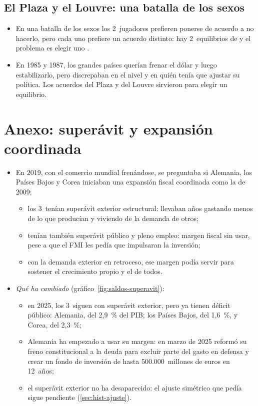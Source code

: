 \documentclass[11pt]{article}
\begin{document}
\subsection*{El Plaza y el Louvre: una batalla de los sexos}

\begin{itemize}
\item En una batalla de los sexos los 2~jugadores prefieren ponerse de acuerdo a no hacerlo, pero cada uno prefiere un acuerdo distinto: hay 2~equilibrios de  y el problema es elegir uno .
\item En 1985 y 1987, los grandes países querían frenar el dólar y luego estabilizarlo, pero discrepaban en el nivel y en quién tenía que ajustar su política. Los acuerdos del Plaza y del Louvre sirvieron para elegir un equilibrio\nocite{G51985Plaza,G61987Louvre}.
\end{itemize}

\section{Anexo: superávit y expansión coordinada}\label{anexo:superavit}

\begin{itemize}
\item En 2019, con el comercio mundial frenándose, \textcite{GarciaAndres2019Oberturas} se preguntaba si Alemania, los Países Bajos y Corea iniciaban una expansión fiscal coordinada como la de 2009:
  \begin{itemize}
  \item los 3~tenían superávit exterior estructural: llevaban años gastando menos de lo que producían y viviendo de la demanda de otros;
  \item tenían también superávit público y pleno empleo: margen fiscal sin usar, pese a que el FMI les pedía que impulsaran la inversión;
  \item con la demanda exterior en retroceso, ese margen podía servir para sostener el crecimiento propio y el de todos.
  \end{itemize}
\item \emph{Qué ha cambiado} (gráfico~\ref{fig:saldos-superavit}):
  \begin{itemize}
  \item en 2025, los 3~siguen con superávit exterior, pero ya tienen déficit público: Alemania, del 2,9~\% del PIB; los Países Bajos, del 1,6~\%, y Corea, del 2,3~\%\nocite{FMI2026WEOdatos};
  \item Alemania ha empezado a usar su margen: en marzo de 2025 reformó su freno constitucional a la deuda para excluir parte del gasto en defensa y crear un fondo de inversión de hasta 500.000~millones de euros en 12~años\nocite{Bundestag2025Grundgesetz};
  \item el superávit exterior no ha desaparecido: el ajuste simétrico que pedía  sigue pendiente (\ref{sec:hist-ajuste}).
  \end{itemize}
\end{itemize}
\end{document}
